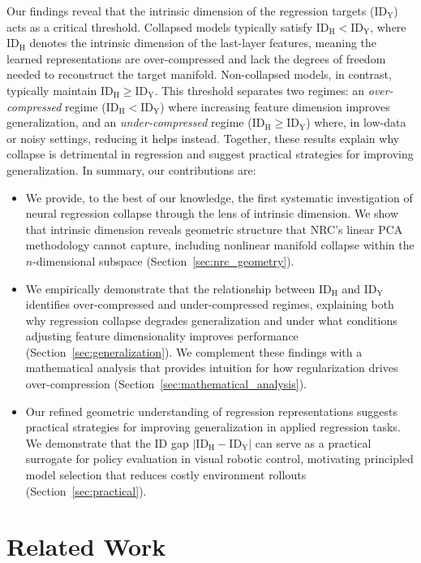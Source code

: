 \documentclass{article}
\newcommand{\idh}{\ensuremath{\mathrm{ID}_{\mathrm{H}}}}
\newcommand{\idy}{\ensuremath{\mathrm{ID}_{\mathrm{Y}}}}
\theoremstyle{plain}
\theoremstyle{definition}
\theoremstyle{remark}
\begin{document}
Our findings reveal that the intrinsic dimension of the regression targets ($\idy$) acts as a critical threshold. Collapsed models typically satisfy $\idh < \idy$, where $\idh$ denotes the intrinsic dimension of the last-layer features, meaning the learned representations are over-compressed and lack the degrees of freedom needed to reconstruct the target manifold. Non-collapsed models, in contrast, typically maintain $\idh \ge \idy$. This threshold separates two regimes: an \emph{over-compressed} regime ($\idh < \idy$) where increasing feature dimension improves generalization, and an \emph{under-compressed} regime ($\idh \ge \idy$) where, in low-data or noisy settings, reducing it helps instead. Together, these results explain why collapse is detrimental in regression and suggest practical strategies for improving generalization. In summary, our contributions are:
\begin{itemize}[leftmargin=16pt]
    \item We provide, to the best of our knowledge, the first systematic investigation of neural regression collapse through the lens of intrinsic dimension. We show that intrinsic dimension reveals geometric structure that NRC's linear PCA methodology cannot capture, including nonlinear manifold collapse within the $n$-dimensional subspace (Section~\ref{sec:nrc_geometry}).

    \item We empirically demonstrate that the relationship between $\idh$ and $\idy$ identifies over-compressed and under-compressed regimes, explaining both why regression collapse degrades generalization and under what conditions adjusting feature dimensionality improves performance (Section~\ref{sec:generalization}). We complement these findings with a mathematical analysis that provides intuition for how regularization drives over-compression (Section~\ref{sec:mathematical_analysis}).
    
    \item Our refined geometric understanding of regression representations suggests practical strategies for improving generalization in applied regression tasks. We demonstrate that the ID gap $|\idh - \idy|$ can serve as a practical surrogate for policy evaluation in visual robotic control, motivating principled model selection that reduces costly environment rollouts (Section~\ref{sec:practical}).
\end{itemize}


\section{Related Work} \label{sec:related_work}
\end{document}
